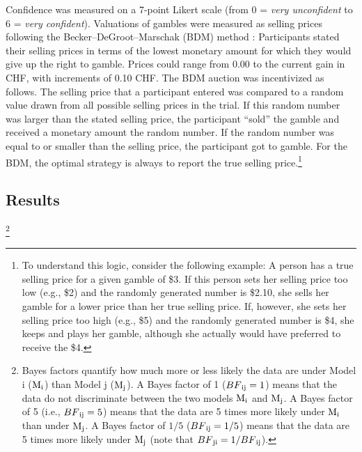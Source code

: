 \documentclass[a4paper, man, natbib, floatsintext]{apa6}
\begin{document}
Confidence was measured on a 7-point Likert scale (from 0 = \textit{very unconfident} to 6 = \textit{very confident}). Valuations of gambles were measured as selling prices following the Becker--DeGroot--Marschak (BDM) method \citep{Becker1964}: Participants stated their selling prices in terms of the lowest monetary amount for which they would give up the right to gamble. Prices could range from 0.00 to the current gain in CHF, with increments of 0.10 CHF. The BDM auction was incentivized as follows. The selling price that a participant entered was compared to a random value drawn from all possible selling prices in the trial. If this random number was larger than the stated selling price, the participant ``sold'' the gamble and received a monetary amount  the random number. If the random number was equal to or smaller than the selling price, the participant got to gamble. For the BDM, the optimal strategy is always to report the true selling price.\footnote{\label{logic.BDM}
To understand this logic, consider the following example: A person has a true selling price for a given gamble of \$3. If this person sets her selling price too low (e.g., \$2) and the randomly generated number is \$2.10, she sells her gamble for a lower price than her true selling price. If, however, she sets her selling price too high (e.g., \$5) and the randomly generated number is \$4, she keeps and plays her gamble, although she actually would have preferred to receive the \$4.
} 

\subsection{Results}
\footnote{Bayes factors quantify how much more or less likely the data are under Model i ($\mathrm{M}\textsubscript{i}$) than Model j ($\mathrm{M}\textsubscript{j}$). A Bayes factor of 1 ($BF\textsubscript{ij} = 1$) means that the data do not discriminate between the two models $\mathrm{M}\textsubscript{i}$ and $\mathrm{M}\textsubscript{j}$. A Bayes factor of 5 (i.e., $BF\textsubscript{ij} = 5$) means that the data are 5 times more likely under $\mathrm{M}\textsubscript{i}$ than under $\mathrm{M}\textsubscript{j}$. A Bayes factor of $1/5$ ($BF\textsubscript{ij} = 1/5$) means that the data are 5 times more likely under $\mathrm{M}\textsubscript{j}$ (note that $BF\textsubscript{ji} = 1/BF\textsubscript{ij}$).} 
\end{document}
